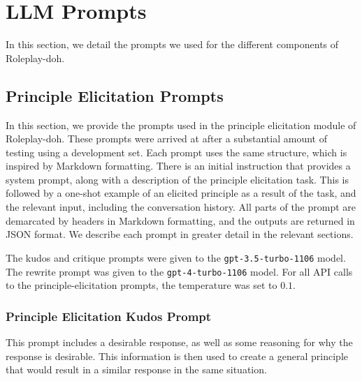 \documentclass[11pt]{article}
\begin{document}
\section{LLM Prompts}
\label{sec:llmprompts}

In this section, we detail the prompts we used for the different components of Roleplay-doh.
\subsection{Principle Elicitation Prompts} \label{sec:principle-elicitation-prompts}
In this section, we provide the prompts used in the principle elicitation module of Roleplay-doh. These prompts were arrived at after a substantial amount of testing using a development set. Each prompt uses the same structure, which is inspired by Markdown formatting. There is an initial instruction that provides a system prompt, along with a description of the principle elicitation task. This is followed by a one-shot example of an elicited principle as a result of the task, and the relevant input, including the conversation history. All parts of the prompt are demarcated by headers in Markdown formatting, and the outputs are returned in JSON format. We describe each prompt in greater detail in the relevant sections.

The kudos and critique prompts were given to the \lstinline{gpt-3.5-turbo-1106} model. The rewrite prompt was given to the \lstinline{gpt-4-turbo-1106} model. For all API calls to the principle-elicitation prompts, the temperature was set to $0.1$.

\subsubsection{Principle Elicitation Kudos Prompt}

This prompt includes a desirable response, as well as some reasoning for why the response is desirable. This information is then used to create a general principle that would result in a similar response in the same situation. 
\end{document}
